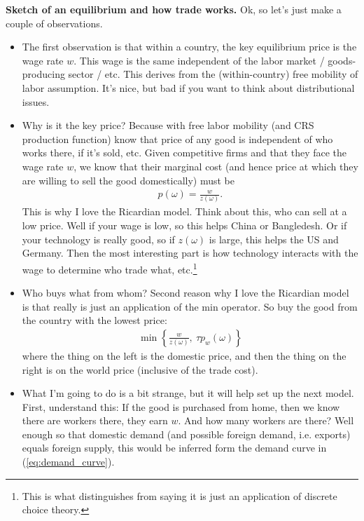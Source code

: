 \documentclass[pdftex,12pt]{article}
\begin{document}
\medskip
\noindent \textbf{Sketch of an equilibrium and how trade works.} Ok, so let's just make a couple of observations.

\begin{itemize}
\item The first observation is that within a country, the key equilibrium price is the wage rate $w$. This wage is the same independent of the labor market / goods-producing sector / etc. This derives from the (within-country) free mobility of labor assumption. It's nice, but bad if you want to think about distributional issues.

\item Why is it the key price? Because with free labor mobility (and CRS production function) know that price of any good is independent of who works there, if it's sold, etc. Given competitive firms and that they face the wage rate $w$, we know that their marginal cost (and hence price at which they are willing to sell the good domestically) must be
    \begin{align}
    p(\omega) = \frac{w}{z(\omega)}.
    \label{eq:ek_wage}
    \end{align}
    This is why I love the Ricardian model. Think about this, who can sell at a low price. Well if your wage is low, so this helps China or Bangledesh. Or if your technology is really good, so if $z(\omega)$ is large, this helps the US and Germany. Then the most interesting part is how technology interacts with the wage to determine who trade what, etc.\footnote{This is what distinguishes \citet{eaton2002technology} from saying it is just an application of discrete choice theory.}

\item Who buys what from whom? Second reason why I love the Ricardian model is that really is just an application of the min operator. So buy the good from the country with the lowest price:
    \begin{align}
    \min\left\{ \frac{w}{z(\omega)} , \ \tau p_w(\omega) \right\}
    \end{align}
where the thing on the left is the domestic price, and then the thing on the right is on the world price (inclusive of the trade cost).

\item What I'm going to do is a bit strange, but it will help set up the next model. First, understand this:  If the good is purchased from home, then we know there are workers there, they earn $w$. And how many workers are there? Well enough so that domestic demand (and possible foreign demand, i.e. exports) equals foreign supply, this would be inferred form the demand curve in (\ref{eq:demand_curve}).


\end{itemize}
\end{document}
